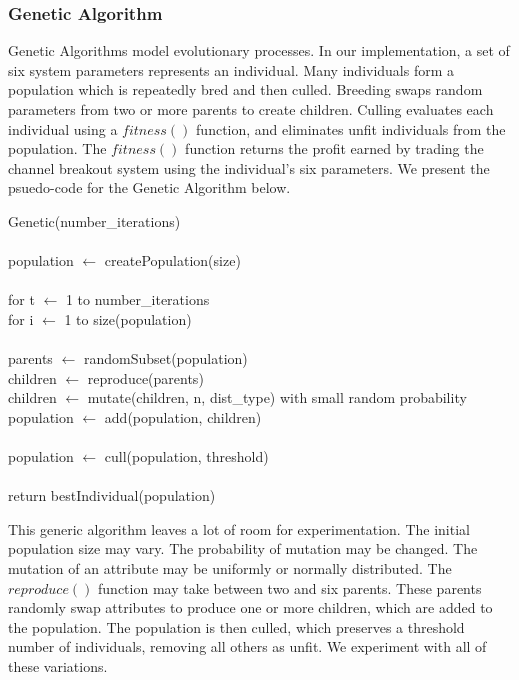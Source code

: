 \documentclass[12pt]{article}
\begin{document}
\subsubsection{Genetic Algorithm}

Genetic Algorithms model evolutionary processes.  In our implementation, a set
of six system parameters represents an individual.  Many individuals form a
population which is repeatedly bred and then culled.  Breeding swaps random
parameters from two or more parents to create children.  Culling evaluates each
individual using a $fitness()$ function, and eliminates unfit individuals from
the population.  The $fitness()$ function returns the profit earned by trading
the channel breakout system using the individual's six parameters.  We present
the psuedo-code for the Genetic Algorithm below.

\vspace{10pt}
\setlength{\parindent}{5mm}
\indent Genetic(number\_iterations)\\\\
\indent\indent population $\leftarrow$ createPopulation(size)\\\\
\indent \indent for t $\leftarrow$ 1 to number\_iterations\\
\indent \indent \indent for i $\leftarrow$ 1 to size(population)\\\\
\indent \indent \indent \indent parents $\leftarrow$ randomSubset(population)\\
\indent \indent \indent \indent children $\leftarrow$ reproduce(parents)\\
\indent \indent \indent \indent children $\leftarrow$ mutate(children, n, dist\_type) with small random probability\\
\indent \indent \indent \indent population $\leftarrow$ add(population, children)\\\\
\indent \indent \indent population $\leftarrow$ cull(population, threshold)\\\\
\indent \indent return bestIndividual(population)\\
\setlength{\parindent}{0mm}

This generic algorithm leaves a lot of room for experimentation. The initial
population size may vary.  The probability of mutation may be changed.  The
mutation of an attribute may be uniformly or normally distributed.  The
$reproduce()$ function may take between two and six parents.  These parents
randomly swap attributes to produce one or more children, which are added to the
population.  The population is then culled, which preserves a threshold number
of individuals, removing all others as unfit. We experiment with all of these
variations.
\end{document}
